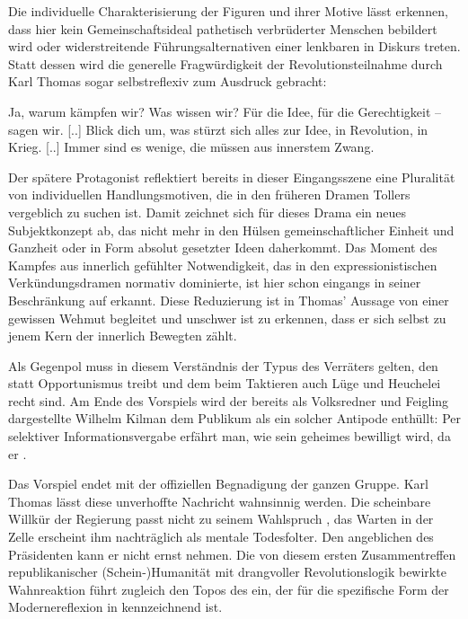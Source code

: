 Die individuelle Charakterisierung der Figuren und ihrer Motive lässt
erkennen, dass hier kein Gemeinschaftsideal pathetisch verbrüderter Menschen
bebildert wird oder widerstreitende Führungsalternativen einer lenkbaren
\Cite{Masse} in Diskurs treten. Statt dessen wird die generelle
Fragwürdigkeit der Revolutionsteilnahme durch Karl Thomas sogar selbstreflexiv
zum Ausdruck gebracht:

\begin{BlockQuote}
  Ja, warum kämpfen wir? Was wissen wir? Für die Idee, für die Gerechtigkeit --
  sagen wir. [..] Blick dich um, was stürzt sich alles zur Idee, in
  Revolution, in Krieg. [..] Immer sind es wenige, die müssen aus innerstem
  Zwang. 
\end{BlockQuote}
Der spätere Protagonist reflektiert bereits in dieser
Eingangsszene eine Pluralität von individuellen Handlungsmotiven, die in den
früheren Dramen Tollers vergeblich zu suchen ist. Damit zeichnet sich für
dieses Drama ein neues Subjektkonzept ab, das nicht mehr in den Hülsen
gemeinschaftlicher Einheit und Ganzheit oder in Form absolut gesetzter Ideen
daherkommt. Das Moment des Kampfes aus innerlich gefühlter Notwendigkeit, das
in den expressionistischen Verkündungsdramen normativ dominierte, ist hier
schon eingangs in seiner Beschränkung auf \Cite{wenige} erkannt. Diese
Reduzierung ist in Thomas' Aussage von einer gewissen Wehmut begleitet und
unschwer ist zu erkennen, dass er sich selbst zu jenem Kern der innerlich
Bewegten zählt.

Als Gegenpol muss in diesem Verständnis der Typus des Verräters gelten, den
statt \Cite{innerstem Zwang} Opportunismus treibt und dem beim Taktieren auch
Lüge und Heuchelei recht sind. Am Ende des Vorspiels wird der bereits als
Volksredner und Feigling  
dargestellte Wilhelm Kilman dem Publikum als ein solcher Antipode
enthüllt: Per selektiver Informationsvergabe
erfährt man, wie sein geheimes \Cite{Gnadengesuch} bewilligt wird, da er
\Cite{gegen [seinen] Willen in die Reihen der Aufrührer [kam]}
.

Das Vorspiel endet mit der offiziellen Begnadigung der ganzen Gruppe. Karl
Thomas lässt diese unverhoffte Nachricht wahnsinnig werden. Die scheinbare
Willkür der Regierung passt nicht zu seinem Wahlspruch \Cite{Guter Sieg oder
guter Tod} , das Warten in der Zelle erscheint ihm
nachträglich als mentale Todesfolter. Den angeblichen \Cite{Willen zur
Versöhnung}  des Präsidenten kann er nicht ernst
nehmen. Die von diesem ersten Zusammentreffen republikanischer
(Schein-)Humanität mit drangvoller Revolutionslogik bewirkte Wahnreaktion
führt zugleich den Topos des  ein, der für die
spezifische Form der Modernereflexion in 
kennzeichnend ist.

